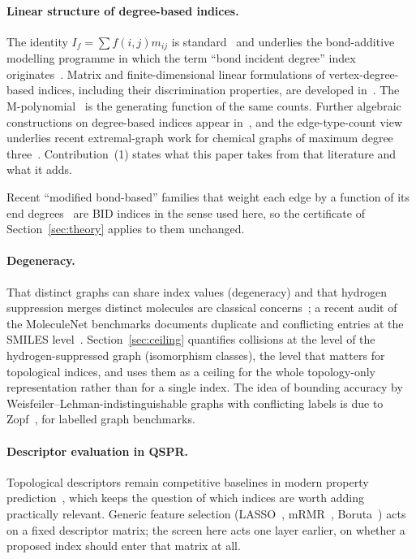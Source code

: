 \documentclass[11pt,a4paper]{article}
\theoremstyle{definition}
\begin{document}
\paragraph{Linear structure of degree-based indices.} The identity
$I_f=\sum f(i,j)m_{ij}$ is standard~\cite{Gutman2013Degree,RadaCruz2014VDB}
and underlies the bond-additive modelling programme in which the
term ``bond incident degree'' index originates~\cite{VukicevicGasperov2010Adriatic,VukicevicDjurdjevic2011BID}.
Matrix and finite-dimensional linear formulations of
vertex-degree-based indices, including their discrimination
properties, are developed in~\cite{CruzEspinalRada2024Matrix,Rada2026LinearVDB}.
The M-polynomial~\cite{DeutschKlavzar2015} is the generating function
of the same counts. Further algebraic constructions on degree-based
indices appear in~\cite{GutmanBuragohainNyauli2026Concealed}, and the
edge-type-count view underlies recent extremal-graph work for chemical
graphs of maximum degree
three~\cite{Bonte2025Extremal,Dusollier2025Polyhedral,Bonte2025ChemicHull}.
Contribution~(1) states what this paper takes from that literature
and what it adds.

Recent ``modified bond-based'' families that weight each edge by a
function of its end degrees~\cite{Altairi2026Modified} are BID indices in
the sense used here, so the certificate of Section~\ref{sec:theory}
applies to them unchanged.

\paragraph{Degeneracy.} That distinct graphs can share index values
(degeneracy) and that hydrogen suppression merges distinct molecules
are classical concerns~\cite{Konstantinova1996,Pogliani2008,Dehmer2012Degeneracy};
a recent audit of the MoleculeNet benchmarks documents duplicate and
conflicting entries at the SMILES level~\cite{SchuhDanilukSieber2026}.
Section~\ref{sec:ceiling} quantifies collisions at the level of the
hydrogen-suppressed graph (isomorphism classes), the level that
matters for topological indices, and uses them as a ceiling for the
whole topology-only representation rather than for a single index.
The idea of bounding accuracy by Weisfeiler--Lehman-indistinguishable
graphs with conflicting labels is due to Zopf~\cite{Zopf2022WL}, for
labelled graph benchmarks.

\paragraph{Descriptor evaluation in QSPR.} Topological descriptors
remain competitive baselines in modern property
prediction~\cite{AdamczykCzech2024MOLTOP,PraskiAdamczykCzech2025}, which keeps the question of
which indices are worth adding practically relevant. Generic feature
selection (LASSO~\cite{Tibshirani1996}, mRMR~\cite{PengLongDing2005},
Boruta~\cite{KursaRudnicki2010}) acts on a fixed descriptor matrix;
the screen here acts one layer earlier, on whether a proposed index
should enter that matrix at all.
\end{document}
